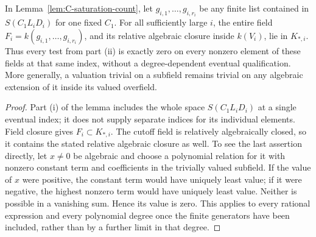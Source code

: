 \begin{corollary}
\label{cor:C-neutral-field}
In Lemma~\ref{lem:C-saturation-count}, let $g_{i,1},\ldots,g_{i,r_i}$
be any finite list contained in $S(C_1L_iD_i)$ for one fixed $C_1$.
For all sufficiently large $i$, the entire field
$F_i=k(g_{i,1},\ldots,g_{i,r_i})$, and its relative algebraic closure
inside $k(V_i)$, lie in $K_{*,i}$.  Thus every test from part
\textup{(ii)} is exactly zero on every nonzero element of these fields
at that same index, without a degree-dependent eventual qualification.
More generally, a valuation trivial on a subfield remains trivial on
any algebraic extension of it inside its valued overfield.
\end{corollary}

\begin{proof}
Part (i) of the lemma includes the whole space $S(C_1L_iD_i)$ at a
single eventual index; it does not supply separate indices for its
individual elements.  Field closure gives $F_i\subset K_{*,i}$.
The cutoff field is relatively algebraically closed, so it contains
the stated relative algebraic closure as well.  To see the last
assertion directly, let $x\ne0$ be algebraic and choose a polynomial
relation for it with nonzero constant term and coefficients in the
trivially valued subfield.  If the value of $x$ were positive, the
constant term would have uniquely least value; if it were negative,
the highest nonzero term would have uniquely least value.  Neither is
possible in a vanishing sum.  Hence its value is zero.  This applies
to every rational expression and every polynomial degree once the
finite generators have been included, rather than by a further limit
in that degree.
\end{proof}
